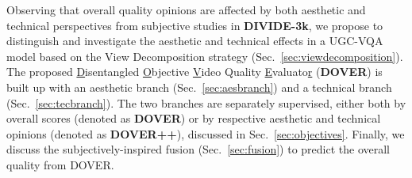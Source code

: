 \documentclass[10pt,twocolumn,letterpaper]{article}
\begin{document}
Observing that overall quality opinions are affected by both aesthetic and technical perspectives from subjective studies in \textbf{DIVIDE-3k}, we propose to distinguish and investigate the aesthetic and technical effects in a UGC-VQA model based on the View Decomposition strategy (Sec.~\ref{sec:viewdecomposition}). The proposed \underline{D}isentangled \underline{O}bjective \underline{V}ideo Quality \underline{E}valuato\underline{r} (\textbf{DOVER}) is built up with an aesthetic branch (Sec.~\ref{sec:aesbranch}) and a technical branch (Sec.~\ref{sec:tecbranch}). The two branches are separately supervised, either both by overall scores (denoted as \textbf{DOVER}) or by respective aesthetic and technical opinions (denoted as \textbf{DOVER++}), discussed in Sec.~\ref{sec:objectives}. Finally, we discuss the subjectively-inspired fusion (Sec.~\ref{sec:fusion}) to predict the overall quality from DOVER.
\end{document}
